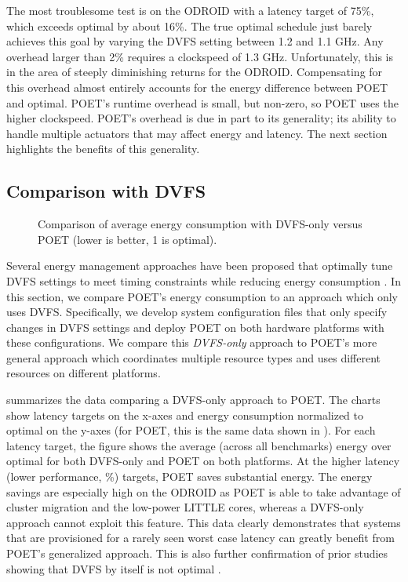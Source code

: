 The most troublesome test is  on the ODROID with a latency target of 75\%, which exceeds optimal by about 16\%.
The true optimal schedule just barely achieves this goal by varying the DVFS setting between 1.2 and 1.1 GHz.
Any overhead larger than 2\% requires a clockspeed of 1.3 GHz.
Unfortunately, this is in the area of steeply diminishing returns for the ODROID.
Compensating for this overhead almost entirely accounts for the energy difference between POET and optimal.
POET's runtime overhead is small, but non-zero, so POET uses the higher clockspeed.
POET's overhead is due in part to its generality; \ie its ability to handle multiple actuators that may affect energy and latency.
The next section highlights the benefits of this generality.


\subsection{Comparison with DVFS}
\label{sec:poet-eval-dvfs}

\begin{figure}[t]
  \centering
  
  \caption{Comparison of average energy consumption with DVFS-only versus POET (lower is better, 1 is optimal).}
  \label{fig:poet-dvfs-compare}
\end{figure}

Several energy management approaches have been proposed that optimally tune DVFS settings to meet timing constraints while reducing energy consumption \cite{Albers}.
In this section, we compare POET's energy consumption to an approach which only uses DVFS.
Specifically, we develop system configuration files that only specify changes in DVFS settings and deploy POET on both hardware platforms with these configurations.
We compare this \emph{DVFS-only} approach to POET's more general approach which coordinates multiple resource types and uses different resources on different platforms.

 summarizes the data comparing a DVFS-only approach to POET.
The charts show latency targets on the x-axes and energy consumption normalized to optimal on the y-axes (for POET, this is the same data shown in ).
For each latency target, the figure shows the average (across all benchmarks) energy over optimal for both DVFS-only and POET on both platforms.
At the higher latency (lower performance, \%) targets, POET saves substantial energy.
The energy savings are especially high on the ODROID as POET is able to take advantage of cluster migration and the low-power LITTLE cores, whereas a DVFS-only approach cannot exploit this feature.
This data clearly demonstrates that systems that are provisioned for a rarely seen worst case latency can greatly benefit from POET's generalized approach.
This is also further confirmation of prior studies showing that DVFS by itself is not optimal \cite{Hoffmann2012,MeisnerISCA2011}.

